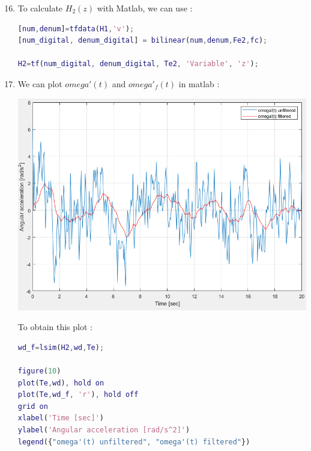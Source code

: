 \documentclass[a4paper,12pt]{article}
\begin{document}
\begin{enumerate}[label={\color{blue}\arabic*)}]
    \setcounter{enumi}{15}

    \item
    To calculate \(H_2(z)\) with Matlab, we can use :
    \begin{lstlisting}[style=Matlab-editor,language=Matlab, basicstyle=\small\ttfamily]
[num,denum]=tfdata(H1,'v');
[num_digital, denum_digital] = bilinear(num,denum,Fe2,fc);

H2=tf(num_digital, denum_digital, Te2, 'Variable', 'z');
        \end{lstlisting}

    \item
    We can plot \(omega'(t)\) and \(omega'_f(t)\) in matlab :
    \begin{multicols}{2}
    \begin{flushleft}
            \includegraphics[width=1\linewidth]{Images/omega_dot_filtered.png}
            \label{Figure13}
        \end{flushleft}
    \columnbreak
    To obtain this plot :
    \begin{lstlisting}[style=Matlab-editor,language=Matlab, basicstyle=\small\ttfamily]
wd_f=lsim(H2,wd,Te);

figure(10)
plot(Te,wd), hold on
plot(Te,wd_f, 'r'), hold off
grid on
xlabel('Time [sec]')
ylabel('Angular acceleration [rad/s^2]')
legend({"omega'(t) unfiltered", "omega'(t) filtered"})
        \end{lstlisting}
        

\end{multicols}
\end{enumerate}
\end{document}
